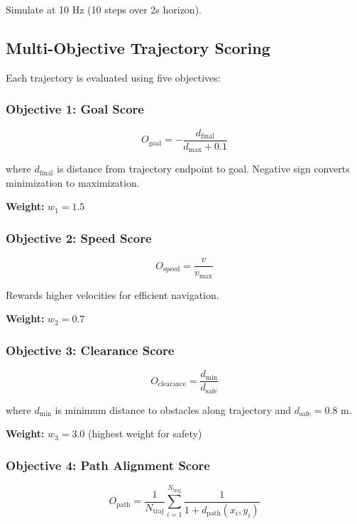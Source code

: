 Simulate at 10 Hz (10 steps over 2s horizon).

\subsection{Multi-Objective Trajectory Scoring}

Each trajectory is evaluated using five objectives:

\subsubsection{Objective 1: Goal Score}
\begin{equation}
O_{\text{goal}} = -\frac{d_{\text{final}}}{d_{\max} + 0.1}
\label{eq:dwa_goal}
\end{equation}

where $d_{\text{final}}$ is distance from trajectory endpoint to goal. Negative sign converts minimization to maximization.

\textbf{Weight:} $w_1 = 1.5$

\subsubsection{Objective 2: Speed Score}
\begin{equation}
O_{\text{speed}} = \frac{v}{v_{\max}}
\label{eq:dwa_speed}
\end{equation}

Rewards higher velocities for efficient navigation.

\textbf{Weight:} $w_2 = 0.7$

\subsubsection{Objective 3: Clearance Score}
\begin{equation}
O_{\text{clearance}} = \frac{d_{\min}}{d_{\text{safe}}}
\label{eq:dwa_clearance}
\end{equation}

where $d_{\min}$ is minimum distance to obstacles along trajectory and $d_{\text{safe}} = 0.8$ m.

\textbf{Weight:} $w_3 = 3.0$ (highest weight for safety)

\subsubsection{Objective 4: Path Alignment Score}
\begin{equation}
O_{\text{path}} = \frac{1}{N_{\text{traj}}} \sum_{i=1}^{N_{\text{traj}}} \frac{1}{1 + d_{\text{path}}(x_i, y_i)}
\label{eq:dwa_path}
\end{equation}

